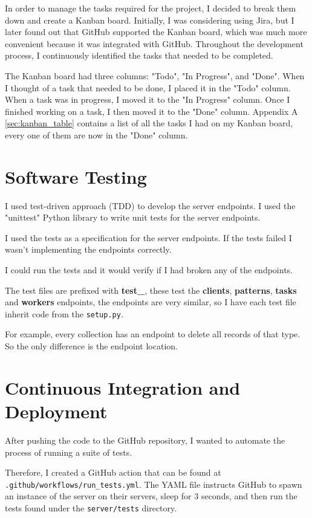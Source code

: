 In order to manage the tasks required for the project,
I decided to break them down and create a Kanban board.
Initially, I was considering using Jira, but I later found out that
GitHub supported the Kanban board,
which was much more convenient because it was integrated with GitHub.
Throughout the development process,
I continuously identified the tasks that needed to be completed.

The Kanban board had three columns: "Todo", "In Progress", and "Done".
When I thought of a task that needed to be done, I placed it in the "Todo" column.
When a task was in progress, I moved it to the "In Progress" column.
Once I finished working on a task, I then moved it to the "Done" column.
Appendix A \ref{sec:kanban_table} contains a list of
all the tasks I had on my Kanban board,
every one of them are now in the "Done" column.

\section{Software Testing}
I used test-driven approach (TDD) to develop the server endpoints.
I used the "unittest" Python library to write unit tests for the server endpoints.

I used the tests as a specification for the server endpoints.
If the tests failed I wasn't implementing the endpoints correctly.

I could run the tests and it would verify if I had broken any of the endpoints.

The test files are prefixed with \textbf{test\_},
these test the \textbf{clients}, \textbf{patterns},
\textbf{tasks} and \textbf{workers} endpoints,
the endpoints are very similar, so I have each test file
inherit code from the \texttt{setup.py}.

For example, every collection has an endpoint to delete all records of that type.
So the only difference is the endpoint location.

\section{Continuous Integration and Deployment}
After pushing the code to the GitHub repository,
I wanted to automate the process of running a suite of tests.

Therefore, I created a GitHub action that can be found at \\
\texttt{.github/workflows/run\_tests.yml}.
The YAML file instructs GitHub to spawn an instance of the server on their servers,
sleep for 3 seconds, and then run the tests found
under the \texttt{server/tests} directory.

